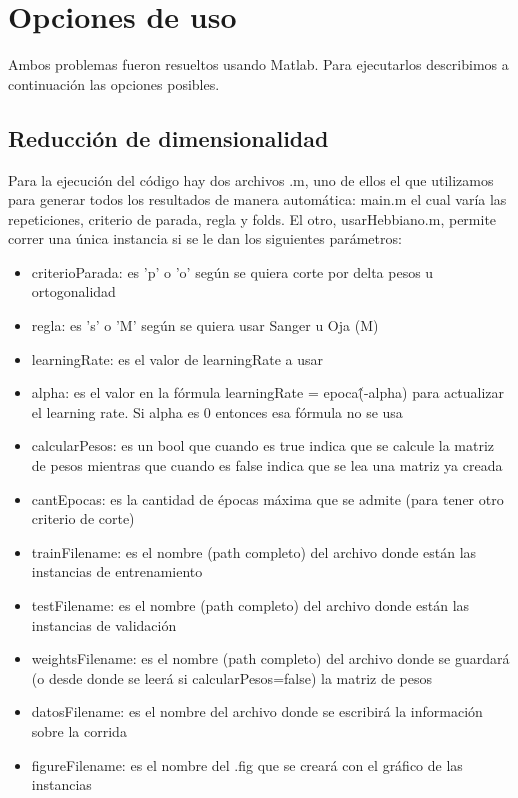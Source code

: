 \documentclass[informe.tex]{subfiles}
\begin{document}
  
  \section{Opciones de uso}

    Ambos problemas fueron resueltos usando Matlab. Para ejecutarlos describimos a continuación las opciones posibles.
  
    \subsection{Reducción de dimensionalidad}
      Para la ejecución del código hay dos archivos .m, uno de ellos el que utilizamos para generar todos los resultados de manera autom\'atica: main.m el cual varía las repeticiones, criterio de parada, regla y folds. El otro, usarHebbiano.m, permite correr una única instancia si se le dan los siguientes par\'ametros:
      
      \begin{itemize}
	\item criterioParada: es 'p' o 'o' seg\'un se quiera corte por delta pesos u ortogonalidad
	\item regla: es 's' o 'M' seg\'un se quiera usar Sanger u Oja (M)
	\item learningRate: es el valor de learningRate a usar
	\item alpha: es el valor en la f\'ormula learningRate = epoca\^(-alpha) para actualizar el learning rate. Si alpha es 0 entonces esa f\'ormula no se usa
	\item calcularPesos: es un bool que cuando es true indica que se calcule la matriz de pesos mientras que cuando es false indica que se lea una matriz ya creada
	\item cantEpocas: es la cantidad de \'epocas m\'axima que se admite (para tener otro criterio de corte)
	\item trainFilename: es el nombre (path completo) del archivo donde est\'an las instancias de entrenamiento
	\item testFilename: es el nombre (path completo) del archivo donde est\'an las instancias de validaci\'on
	\item weightsFilename: es el nombre (path completo) del archivo donde se guardar\'a (o desde donde se leer\'a si calcularPesos=false) la matriz de pesos
	\item datosFilename: es el nombre del archivo donde se escribir\'a la informaci\'on sobre la corrida
	\item figureFilename: es el nombre del .fig que se crear\'a con el gr\'afico de las instancias
      \end{itemize}
      
\end{document}
